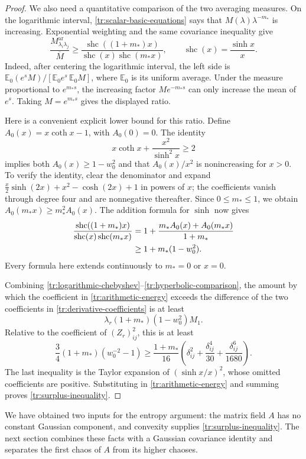 \begin{proof}
We also need a quantitative comparison of the two averaging measures.
On the logarithmic interval, \eqref{tr:scalar-basic-equations} says
that $M(\lambda)\lambda^{-m_*}$ is increasing.  Exponential weighting
and the same covariance inequality give
\begin{equation}\label{tr:average-comparison}
 \frac{M^{\mathrm{ar}}_{\lambda_i\lambda_j}}{\overline M}
 \ge\frac{\operatorname{shc}((1+m_*)x)}
          {\operatorname{shc}(x)\operatorname{shc}(m_*x)},
 \qquad \operatorname{shc}(x)=\frac{\sinh x}{x}.
\end{equation}
Indeed, after centering the logarithmic interval, the left side is
$\mathbb E_0(e^sM)/[\mathbb E_0e^s\,\mathbb E_0M]$, where
$\mathbb E_0$ is its uniform average.  Under the measure proportional
to $e^{m_*s}$, the increasing factor $Me^{-m_*s}$ can only increase
the mean of $e^s$.  Taking $M=e^{m_*s}$ gives the displayed ratio.

Here is a convenient explicit lower bound for this ratio.  Define
$A_0(x)=x\coth x-1$, with $A_0(0)=0$.  The identity
\[
 x\coth x+\frac{x^2}{\sinh^2x}\ge2
\]
implies both $A_0(x)\ge1-w_0^2$ and that $A_0(x)/x^2$ is
nonincreasing for $x>0$.  To verify the identity, clear the denominator
and expand
$\tfrac{x}{2}\sinh(2x)+x^2-\cosh(2x)+1$ in powers of $x$;
the coefficients vanish through degree four and are nonnegative
thereafter.  Since $0\le m_*\le1$, we obtain
$A_0(m_*x)\ge m_*^2A_0(x)$.  The addition formula for $\sinh$ now gives
\begin{align}
 \frac{\operatorname{shc}((1+m_*)x)}
          {\operatorname{shc}(x)\operatorname{shc}(m_*x)}
 &=1+\frac{m_*A_0(x)+A_0(m_*x)}{1+m_*}\notag\\
 &\ge1+m_*(1-w_0^2).
 \label{tr:hyperbolic-comparison}
\end{align}
Every formula here extends continuously to $m_*=0$ or $x=0$.

Combining \eqref{tr:logarithmic-chebyshev}--\eqref{tr:hyperbolic-comparison},
the amount by which the coefficient in
\eqref{tr:arithmetic-energy} exceeds the difference of the two
coefficients in \eqref{tr:derivative-coefficients} is at least
\[
 \lambda_r(1+m_*)(1-w_0^2)M_1.
\]
Relative to the coefficient of $(Z_r)_{ij}^2$, this is at least
\[
 \frac34(1+m_*)(w_0^{-2}-1)
 \ge\frac{1+m_*}{16}
    \left(\delta_{ij}^2+\frac{\delta_{ij}^4}{30}
                            +\frac{\delta_{ij}^6}{1680}\right).
\]
The last inequality is the Taylor expansion of
$(\sinh x/x)^2$, whose omitted coefficients are positive.
Substituting in \eqref{tr:arithmetic-energy} and summing proves
\eqref{tr:surplus-inequality}.
\end{proof}

We have obtained two inputs for the entropy argument: the matrix field
$A$ has no constant Gaussian component, and convexity supplies
\eqref{tr:surplus-inequality}.  The next section combines these facts
with a Gaussian covariance identity and separates the first chaos of
$A$ from its higher chaoses.
